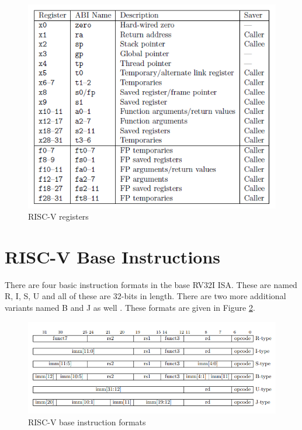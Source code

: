 \begin{figure}[h!]
    \centering
    \includegraphics{riscv/riscv_registers.png}
    \caption{RISC-V registers \cite{rvregisters}}
    \label{fig:riscv_registers}
\end{figure}

\pagebreak
\section{RISC-V Base Instructions}
There are four basic instruction formats in the base RV32I ISA. These are named R, I, S, U and all of these are 32-bits in length. There are two more additional variants named B and J as well \cite{rvmanual}. These formats are given in Figure \ref{fig:risc-v_base_instruction_formats}.
\begin{figure}
    \centering
    \includegraphics{riscv/riscv_base_instruction_formats.png}
    \caption{RISC-V base instruction formats \cite{rvmanual}}
    \label{fig:risc-v_base_instruction_formats}
\end{figure}

